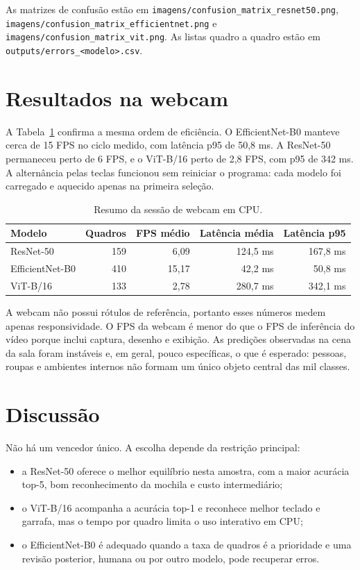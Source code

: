 \documentclass[12pt,a4paper]{article}
\begin{document}
As matrizes de confusão estão em
\texttt{imagens/confusion\_matrix\_resnet50.png},
\texttt{imagens/confusion\_matrix\_efficientnet.png} e
\texttt{imagens/confusion\_matrix\_vit.png}. As listas quadro a quadro estão em
\texttt{outputs/errors\_<modelo>.csv}.

\section{Resultados na webcam}

A Tabela~\ref{tab:webcam} confirma a mesma ordem de eficiência. O EfficientNet-B0
manteve cerca de 15 FPS no ciclo medido, com latência p95 de 50,8 ms. A ResNet-50
permaneceu perto de 6 FPS, e o ViT-B/16 perto de 2,8 FPS, com p95 de 342 ms.
A alternância pelas teclas funcionou sem reiniciar o programa: cada modelo foi
carregado e aquecido apenas na primeira seleção.

\begin{table}[H]
\centering
\caption{Resumo da sessão de webcam em CPU.}
\label{tab:webcam}
\begin{tabular}{lrrrr}
\toprule
Modelo & Quadros & FPS médio & Latência média & Latência p95 \\
\midrule
ResNet-50 & 159 & 6,09 & 124,5 ms & 167,8 ms \\
EfficientNet-B0 & 410 & 15,17 & 42,2 ms & 50,8 ms \\
ViT-B/16 & 133 & 2,78 & 280,7 ms & 342,1 ms \\
\bottomrule
\end{tabular}
\end{table}

A webcam não possui rótulos de referência, portanto esses números medem apenas
responsividade. O FPS da webcam é menor do que o FPS de inferência do vídeo porque
inclui captura, desenho e exibição. As predições observadas na cena da sala foram
instáveis e, em geral, pouco específicas, o que é esperado: pessoas, roupas e
ambientes internos não formam um único objeto central das mil classes.

\section{Discussão}

Não há um vencedor único. A escolha depende da restrição principal:
\begin{itemize}
    \item a ResNet-50 oferece o melhor equilíbrio nesta amostra, com a maior acurácia
    top-5, bom reconhecimento da mochila e custo intermediário;
    \item o ViT-B/16 acompanha a acurácia top-1 e reconhece melhor teclado e garrafa,
    mas o tempo por quadro limita o uso interativo em CPU;
    \item o EfficientNet-B0 é adequado quando a taxa de quadros é a prioridade e uma
    revisão posterior, humana ou por outro modelo, pode recuperar erros.
\end{itemize}
\end{document}
